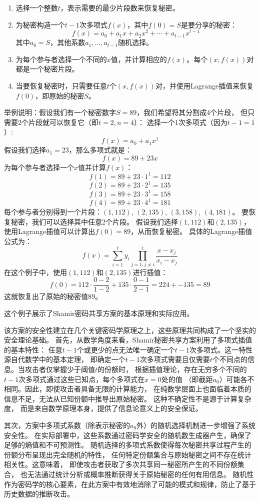 \begin{enumerate}
	\item 选择一个整数$t$，表示需要的最少片段数来恢复秘密。
	\item 为秘密构造一个$t-1$次多项式$f(x)$，其中$f(0)=S$是要分享的秘密：
	      \[f(x) = a_0 + a_1x + a_2x^2 + \cdots + a_{t-1}x^{t-1}\]
	      其中$a_0 = S$，其他系数$a_1,\ldots,a_{t-1}$随机选择。
	\item 为每个参与者选择一个不同的$x$值，并计算相应的$f(x)$。每个$(x,f(x))$对都是一个秘密片段。
	\item 当要恢复秘密时，只需要任意$t$个$(x,f(x))$对，并使用Lagrange插值来恢复$f(0)$，即原始的秘密$S$。
\end{enumerate}

举例说明：假设我们有一个秘密数字$S=89$，我们希望将其分割成4个片段，
但只需要2个片段就可以恢复它（即$t=2,n=4$）：
选择一个1次多项式（因为$t-1=1$）:
\[f(x) = a_0 + a_1x^1\]
假设我们选择$a_1=23$，那么多项式就是：
\[f(x) = 89 + 23x\]
为每个参与者选择一个$x$值并计算$f(x)$：
\[f(1) = 89 + 23\cdot1^1 = 112\]
\[f(2) = 89 + 23\cdot2^1 = 135\]
\[f(3) = 89 + 23\cdot3^1 = 158\]
\[f(4) = 89 + 23\cdot4^1 = 181\]
每个参与者分别得到一个片段：$(1,112)$, $(2,135)$, $(3,158)$, $(4,181)$。
要恢复秘密，我们可以选择其中任意2个片段。
假设我们选择$(1,112)$和$(2,135)$，使用Lagrange插值可以计算出$f(0)=89$，从而恢复秘密。
具体的Lagrange插值公式为：
\[f(x) = \sum_{i=1}^t y_i \prod_{j=1,j\neq i}^t \frac{x-x_j}{x_i-x_j}\]
在这个例子中，使用$(1,112)$和$(2,135)$进行插值：
\[f(0) = 112\cdot\frac{0-2}{1-2} + 135\cdot\frac{0-1}{2-1} = 224 + -135 = 89\]
这就恢复出了原始的秘密值89。

这个例子展示了Shamir密码共享方案的基本原理和实际应用。

该方案的安全性建立在几个关键密码学原理之上，这些原理共同构成了一个坚实的安全理论基础。
首先，从数学角度来看，Shamir秘密共享方案利用了多项式插值的基本特性：
任意$t-1$个或更少的点无法唯一确定一个$t-1$次多项式。这一特性源自代数学中的基本定理，
即确定一个$t-1$次多项式需要且仅需要$t$个不同点的信息。当攻击者仅掌握少于阈值$t$的份额时，
根据插值理论，存在无穷多个不同的$t-1$次多项式通过这些已知点，每个多项式在$x=0$处的值
（即截距$a_0$）可能各不相同。因此，即使攻击者具备无限的计算能力，
在纯数学层面上也面临着本质的信息不足，无法从已知份额中推导出原始秘密。
这种不确定性不是源于计算复杂度，
而是来自数学原理本身，提供了信息论意义上的安全保证。

其次，方案中多项式系数（除表示秘密的$a_0$外）的随机选择机制进一步增强了系统安全性。
在实际部署中，这些系数通过密码学安全的随机数生成器产生，确保了足够的熵值和不可预测性。
随机选择的多项式系数使得每次秘密共享过程产生的份额分布呈现出完全随机的特性，
任何特定份额集合与原始秘密之间不存在统计相关性。这意味着，
即使攻击者获取了多次共享同一秘密所产生的不同份额集合，
也无法通过统计分析或概率推断获得关于原始秘密的任何有用信息。
随机性作为密码学的核心要素，在此方案中有效地消除了可能的模式和规律，防止了基于历史数据的推断攻击。


